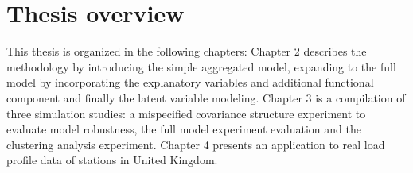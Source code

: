 

\section{Thesis overview}
\label{sec:overview}

This thesis is organized in the following chapters: Chapter 2 describes the methodology by introducing the simple aggregated model, expanding to the full model by incorporating the explanatory variables and additional functional component and finally the latent variable modeling. Chapter 3 is a compilation of three simulation studies: a mispecified covariance structure experiment to evaluate model robustness, the full model experiment evaluation and the clustering analysis experiment. Chapter 4 presents an application to real load profile data of stations in United Kingdom. 
